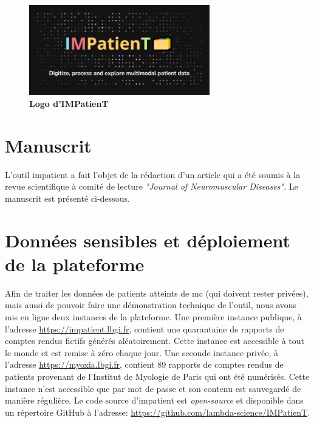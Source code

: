 \begin{figure}[H]
  \centering
  \includegraphics[width=0.7\textwidth]{figures/impatient_banner.png}
  \caption[Logo IMPatienT]{\textbf{Logo d’IMPatienT}}
  \label{fig:impatient_logo}
\end{figure}


\section{Manuscrit} 
L'outil \gls{impatient} a fait l'objet de la rédaction d'un article qui a été soumis à la revue scientifique à comité de lecture \textit{"Journal of Neuromuscular Diseases"}. Le manuscrit est présenté ci-dessous.




\section{Données sensibles et déploiement de la plateforme}
Afin de traiter les données de patients atteints de \gls{mc} (qui doivent rester privées), mais aussi de pouvoir faire une démonstration technique de l'outil, nous avons mis en ligne deux instances de la plateforme. Une première instance publique, à l'adresse \url{https://impatient.lbgi.fr}, contient une quarantaine de rapports de comptes rendus fictifs générés aléatoirement. Cette instance est accessible à tout le monde et est remise à zéro chaque jour. Une seconde instance privée, à l'adresse \url{https://myoxia.lbgi.fr}, contient 89 rapports de comptes rendus de patients provenant de l'Institut de Myologie de Paris qui ont été numérisés. Cette instance n'est accessible que par mot de passe et son contenu est sauvegardé de manière régulière. Le code source d'\gls{impatient} est \textit{open-source} et disponible dans un répertoire GitHub à l'adresse: \url{https://github.com/lambda-science/IMPatienT}.


